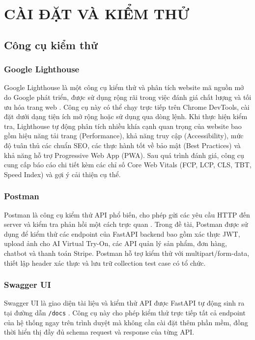 \chapter{CÀI ĐẶT VÀ KIỂM THỬ}

\section{Công cụ kiểm thử}

\subsection{Google Lighthouse}
Google Lighthouse là một công cụ kiểm thử và phân tích website 
mã nguồn mở do Google phát triển, được sử dụng rộng rãi trong 
việc đánh giá chất lượng và tối ưu hóa trang web \cite{lighthouse_docs}. 
Công cụ này có thể chạy trực tiếp trên Chrome DevTools, cài đặt 
dưới dạng tiện ích mở rộng hoặc sử dụng qua dòng lệnh. Khi thực 
hiện kiểm tra, Lighthouse tự động phân tích nhiều khía cạnh quan 
trọng của website bao gồm hiệu năng tải trang (Performance), khả 
năng truy cập (Accessibility), mức độ tuân thủ các chuẩn SEO, 
các thực hành tốt về bảo mật (Best Practices) và khả năng hỗ trợ 
Progressive Web App (PWA). Sau quá trình đánh giá, công cụ cung 
cấp báo cáo chi tiết kèm các chỉ số Core Web Vitals (FCP, LCP, 
CLS, TBT, Speed Index) và gợi ý cải thiện cụ thể.

\subsection{Postman}
Postman là công cụ kiểm thử API phổ biến, cho phép gửi các yêu 
cầu HTTP đến server và kiểm tra phản hồi một cách trực quan 
\cite{postman_docs}. Trong đề tài, Postman được sử dụng để kiểm 
thử các endpoint của FastAPI backend bao gồm xác thực JWT, upload 
ảnh cho AI Virtual Try-On, các API quản lý sản phẩm, đơn hàng, 
chatbot và thanh toán Stripe. Postman hỗ trợ kiểm thử với 
multipart/form-data, thiết lập header xác thực và lưu trữ 
collection test case có tổ chức.

\subsection{Swagger UI}
Swagger UI là giao diện tài liệu và kiểm thử API được FastAPI 
tự động sinh ra tại đường dẫn \texttt{/docs} \cite{fastapi_docs}. 
Công cụ này cho phép kiểm thử trực tiếp tất cả endpoint của hệ 
thống ngay trên trình duyệt mà không cần cài đặt thêm phần mềm, 
đồng thời hiển thị đầy đủ schema request và response của từng API.

